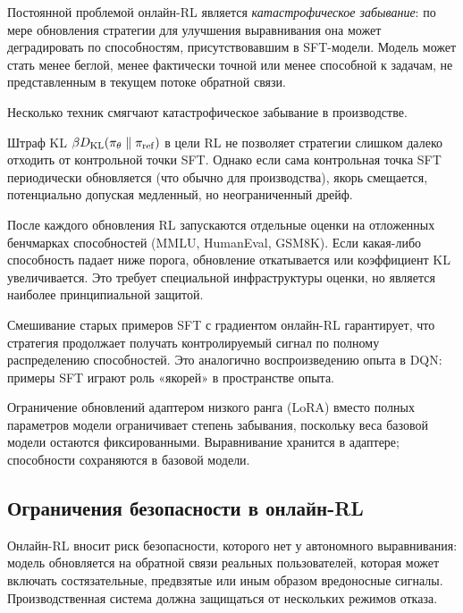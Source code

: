 Постоянной проблемой онлайн-RL является \emph{катастрофическое забывание}: по мере обновления стратегии для улучшения выравнивания она может деградировать по способностям, присутствовавшим в SFT-модели. Модель может стать менее беглой, менее фактически точной или менее способной к задачам, не представленным в текущем потоке обратной связи.

Несколько техник смягчают катастрофическое забывание в производстве.

\begin{description}[leftmargin=!,labelwidth=3.5cm,align=parleft]
  \item[Якорение KL] Штраф KL $\beta D_{\mathrm{KL}}\!\left(\pi_\theta\;\|\;\pi_\mathrm{ref}\right)$ в цели RL не позволяет стратегии слишком далеко отходить от контрольной точки SFT. Однако если сама контрольная точка SFT периодически обновляется (что обычно для производства), якорь смещается, потенциально допуская медленный, но неограниченный дрейф.
  \item[Ограничения на способности] После каждого обновления RL запускаются отдельные оценки на отложенных бенчмарках способностей (MMLU, HumanEval, GSM8K). Если какая-либо способность падает ниже порога, обновление откатывается или коэффициент KL увеличивается. Это требует специальной инфраструктуры оценки, но является наиболее принципиальной защитой.
  \item[Буферы воспроизведения] Смешивание старых примеров SFT с градиентом онлайн-RL гарантирует, что стратегия продолжает получать контролируемый сигнал по полному распределению способностей. Это аналогично воспроизведению опыта в DQN: примеры SFT играют роль «якорей» в пространстве опыта.
  \item[Дообучение на основе LoRA] Ограничение обновлений адаптером низкого ранга (LoRA) вместо полных параметров модели ограничивает степень забывания, поскольку веса базовой модели остаются фиксированными. Выравнивание хранится в адаптере; способности сохраняются в базовой модели.
\end{description}

\subsection{Ограничения безопасности в онлайн-RL}

Онлайн-RL вносит риск безопасности, которого нет у автономного выравнивания: модель обновляется на обратной связи реальных пользователей, которая может включать состязательные, предвзятые или иным образом вредоносные сигналы. Производственная система должна защищаться от нескольких режимов отказа.

